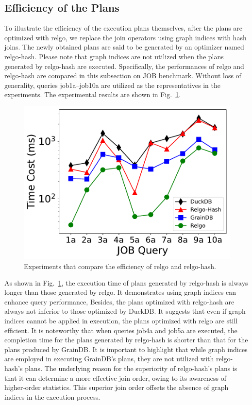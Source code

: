 \subsection{Efficiency of the Plans}
\label{sec:experiment-efficiency-of-plans}

To illustrate the efficiency of the execution plans themselves, after the plans are optimized with relgo, we replace the join operators using graph indices with hash joins.
The newly obtained plans are said to be generated by an optimizer named relgo-hash.
Please note that graph indices are not utilized when the plans generated by relgo-hash are executed.
Specifically, the performances of relgo and relgo-hash are compared in this subsection on JOB benchmark.
Without loss of generality, queries job1a--job10a are utilized as the representatives in the experiments.
The experimental results are shown in Fig.~\ref{fig:exp-hash-plan}.

\begin{figure}[ht]
    \centering
    \includegraphics[width=.9\linewidth]{./figures/exp/hash_plan_job.pdf}
    \caption{Experiments that compare the efficiency of relgo and relgo-hash.}
    \label{fig:exp-hash-plan}
\end{figure}

As shown in Fig.~\ref{fig:exp-hash-plan}, the execution time of plans generated by relgo-hash is always longer than those generated by relgo.
It demonstrates using graph indices can enhance query performance,
Besides, the plans optimized with relgo-hash are always not inferior to those optimized by DuckDB.
It suggests that even if graph indices cannot be applied in execution, the plans optimized with relgo are still efficient.
It is noteworthy that when queries job4a and job5a are executed, the completion time for the plans generated by relgo-hash is shorter than that for the plans produced by GrainDB. 
It is important to highlight that while graph indices are employed in executing GrainDB's plans, they are not utilized with relgo-hash's plans. The underlying reason for the superiority of relgo-hash's plans is that it can determine a more effective join order, owing to its awareness of higher-order statistics. 
This superior join order offsets the absence of graph indices in the execution process.